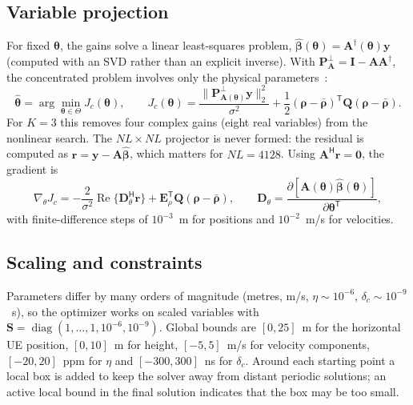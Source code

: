 \documentclass[11pt,a4paper]{article}
\newcommand{\vect}[1]{\bm{#1}}
\newcommand{\T}{\mathsf{T}}
\renewcommand{\H}{\mathsf{H}}
\renewcommand{\Re}{\operatorname{Re}}
\begin{document}
\subsection{Variable projection}
For fixed $\vect{\theta}$, the gains solve a linear least-squares problem,
$\hat{\vect{\beta}}(\vect{\theta})=\vect{A}^{\dagger}(\vect{\theta})\vect{y}$ (computed with an SVD rather than
an explicit inverse). With $\vect{P}^{\perp}_{\vect{A}}=\vect{I}-\vect{A}\vect{A}^{\dagger}$, the concentrated
problem involves only the physical parameters~\cite{golub1973}:
\begin{equation}
\hat{\vect{\theta}}=\arg\min_{\vect{\theta}\in\Theta}J_c(\vect{\theta}),\qquad
J_c(\vect{\theta})=\frac{\|\vect{P}^{\perp}_{\vect{A}(\vect{\theta})}\vect{y}\|_2^2}{\sigma^2}
+\frac{1}{2}(\vect{\rho}-\bar{\vect{\rho}})^{\T}\vect{Q}(\vect{\rho}-\bar{\vect{\rho}}).
\end{equation}
For $K=3$ this removes four complex gains (eight real variables) from the nonlinear search. The
$NL\times NL$ projector is never formed: the residual is computed as $\vect{r}=\vect{y}-\vect{A}\hat{\vect{\beta}}$,
which matters for $NL=4128$. Using $\vect{A}^{\H}\vect{r}=\vect{0}$, the gradient is
\begin{equation}
\nabla_{\theta}J_c=-\frac{2}{\sigma^2}\Re\{\vect{D}_\theta^{\H}\vect{r}\}+\vect{E}_\rho^{\T}\vect{Q}(\vect{\rho}-\bar{\vect{\rho}}),
\qquad \vect{D}_\theta=\frac{\partial[\vect{A}(\vect{\theta})\hat{\vect{\beta}}(\vect{\theta})]}{\partial\vect{\theta}^{\T}},
\end{equation}
with finite-difference steps of $10^{-3}$~m for positions and $10^{-2}$~m/s for velocities.

\subsection{Scaling and constraints}
Parameters differ by many orders of magnitude (metres, m/s, $\eta\sim10^{-6}$, $\delta_c\sim10^{-9}$~s), so the
optimizer works on scaled variables with $\vect{S}=\operatorname{diag}(1,\dots,1,10^{-6},10^{-9})$. Global bounds
are $[0,25]$~m for the horizontal UE position, $[0,10]$~m for height, $[-5,5]$~m/s for velocity components,
$[-20,20]$~ppm for $\eta$ and $[-300,300]$~ns for $\delta_c$. Around each starting point a local box is added to
keep the solver away from distant periodic solutions; an active local bound in the final solution indicates that
the box may be too small.
\end{document}
